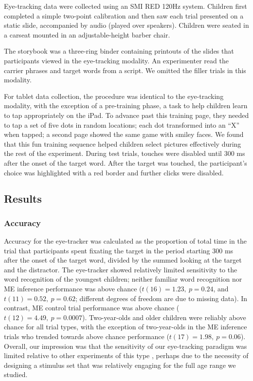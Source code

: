 \documentclass[man,noapacite]{apa2}
\begin{document}
Eye-tracking data were collected using an SMI RED 120Hz system. Children first completed a simple two-point calibration and then saw each trial presented on a static slide, accompanied by audio (played over speakers). Children were seated in a carseat mounted in an adjustable-height barber chair. 

The storybook was a three-ring binder containing printouts of the slides that participants viewed in the eye-tracking modality. An experimenter read the carrier phrases and target words from a script. We omitted the filler trials in this modality.

For tablet data collection, the procedure was identical to the eye-tracking modality, with the exception of a pre-training phase, a task to help children learn to tap appropriately on the iPad. To advance past this training page, they needed to tap a set of five dots in random locations; each dot transformed into an ``X'' when tapped; a second page showed the same game with smiley faces. We found that this fun training sequence helped children select pictures effectively during the rest of the experiment. During test trials, touches were disabled until 300 ms after the onset of the target word. After the target was touched, the participant's choice was highlighted with a red border and further clicks were disabled.  

\subsection{Results}

\subsubsection{Accuracy}

Accuracy for the eye-tracker was calculated as the proportion of total time in the trial that participants spent fixating the target in the period starting 300 ms after the onset of the target word, divided by the summed looking at the target and the distractor. The eye-tracker showed relatively limited sensitivity to the word recognition of the youngest children; neither familiar word recognition nor ME inference performance was above chance ($t(16) = 1.23,~p = 0.24$, and $t(11) = 0.52,~p = 0.62$; different degrees of freedom are due to missing data). In contrast, ME control trial performance was above chance ($t(12) = 4.49,~p = 0.0007$). Two-year-olds and older children were reliably above chance for all trial types, with the exception of two-year-olds in the ME inference trials who trended towards above chance performance ($t(17) = 1.98,~p = 0.06$). Overall, our impression was that the sensitivity of our eye-tracking paradigm was limited relative to other experiments of this type \cite{fernald2006}, perhaps due to the necessity of designing a stimulus set that was relatively engaging for the full age range we studied. 
\end{document}
